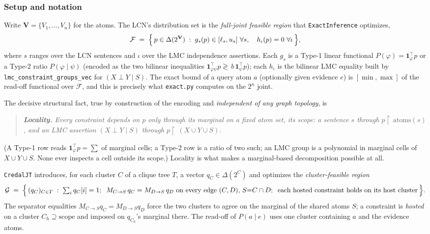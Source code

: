 \documentclass[11pt]{article}
\begin{document}
\subsubsection{Setup and notation}

Write $\mathbf V=\{V_1,\dots,V_n\}$ for the atoms. The LCN's distribution set is the
\emph{full-joint feasible region} that \texttt{ExactInference} optimizes,
\begin{equation}\label{eq:Ffull}
  \mathcal F \;=\; \Bigl\{\, p\in\Delta(2^{\mathbf V}) \;:\;
     g_s(p)\in[\ell_s,u_s]\ \forall s,\quad h_\iota(p)=0\ \forall \iota \,\Bigr\},
\end{equation}
where $s$ ranges over the LCN sentences and $\iota$ over the LMC independence assertions.
Each $g_s$ is a Type-1 linear functional $P(\varphi)=\mathbf 1_\varphi^\top p$ or a Type-2 ratio
$P(\varphi\mid\psi)$ (encoded as the two bilinear inequalities
$\mathbf 1_{\varphi\psi}^\top p\gtrless\,b\,\mathbf 1_\psi^\top p$); each $h_\iota$ is the bilinear
LMC equality built by \texttt{lmc\_constraint\_groups\_vec} for $(X\perp Y\mid S)$. The exact bound
of a query atom $a$ (optionally given evidence $e$) is $[\min,\max]$ of the read-off functional over
$\mathcal F$, and this is precisely what \texttt{exact.py} computes on the $2^n$ joint.

The decisive structural fact, true by construction of the encoding and \emph{independent of any
graph topology}, is

\begin{quote}\emph{\textbf{Locality.} Every constraint depends on $p$ only through its marginal on a
fixed atom set, its \emph{scope}: a sentence $s$ through $p{\restriction}\,\mathrm{atoms}(s)$, and an
LMC assertion $(X\perp Y\mid S)$ through $p{\restriction}\,(X\cup Y\cup S)$.}\end{quote}
(A Type-1 row reads $\mathbf 1_\varphi^\top p=\sum$ of marginal cells; a Type-2 row is a ratio of two
such; an LMC group is a polynomial in marginal cells of $X\cup Y\cup S$. None ever inspects a cell
outside its scope.) Locality is what makes a marginal-based decomposition possible at all.

\texttt{CredalJT} introduces, for each cluster $C$ of a clique tree $T$, a vector
$q_C\in\Delta(2^{C})$ and optimizes the \emph{cluster-feasible region}
\begin{equation}\label{eq:Gjt}
  \mathcal G \;=\; \Bigl\{\, (q_C)_{C\in T} \;:\;
    \textstyle\sum_i q_C[i]=1;\;\;
    M_{C\to S}\,q_C=M_{D\to S}\,q_D\ \text{on every edge }(C,D),\,S{=}C\cap D;\;\;
    \text{each hosted constraint holds on its host cluster} \,\Bigr\}.
\end{equation}
The separator equalities $M_{C\to S}q_C=M_{D\to S}q_D$ force the two clusters to agree on the
marginal of the shared atoms $S$; a constraint is \emph{hosted} on a cluster $C_{h}\supseteq
\mathrm{scope}$ and imposed on $q_{C_h}$'s marginal there. The read-off of $P(a\mid e)$ uses one
cluster containing $a$ and the evidence atoms.
\end{document}
